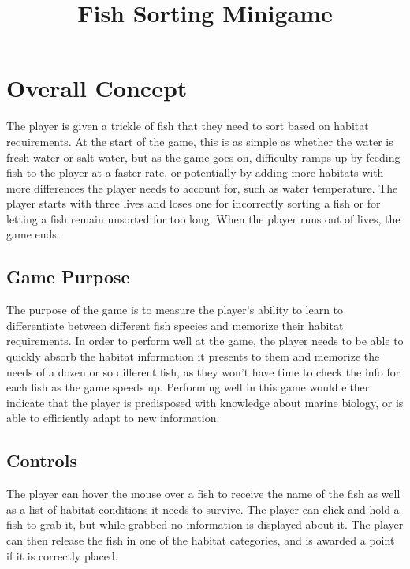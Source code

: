 \documentclass[12pt, a4paper]{article}
\title{Fish Sorting Minigame}
\begin{document}
\maketitle

\section{Overall Concept}
The player is given a trickle of fish that they need to sort based on habitat requirements. At the start of the game, this is as simple as whether the water is fresh water or salt water, but as the game goes on, difficulty ramps up by feeding fish to the player at a faster rate, or potentially by adding more habitats with more differences the player needs to account for, such as water temperature. The player starts with three lives and loses one for incorrectly sorting a fish or for letting a fish remain unsorted for too long. When the player runs out of lives, the game ends.

\subsection{Game Purpose}
The purpose of the game is to measure the player's ability to learn to differentiate between different fish species and memorize their habitat requirements. In order to perform well at the game, the player needs to be able to quickly absorb the habitat information it presents to them and memorize the needs of a dozen or so different fish, as they won't have time to check the info for each fish as the game speeds up. Performing well in this game would either indicate that the player is predisposed with knowledge about marine biology, or is able to efficiently adapt to new information.

\subsection{Controls}
The player can hover the mouse over a fish to receive the name of the fish as well as a list of habitat conditions it needs to survive. The player can click and hold a fish to grab it, but while grabbed no information is displayed about it. The player can then release the fish in one of the habitat categories, and is awarded a point if it is correctly placed.
\end{document}
